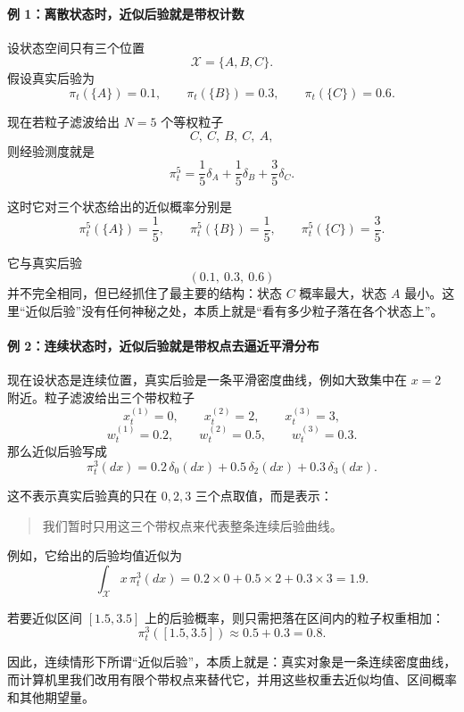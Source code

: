 \documentclass[12pt,a4paper]{ctexart}
\begin{document}
\paragraph{例 1：离散状态时，近似后验就是带权计数}
设状态空间只有三个位置
\[
\mathcal X = \{A,B,C\}.
\]
假设真实后验为
\[
\pi_t(\{A\})=0.1,\qquad
\pi_t(\{B\})=0.3,\qquad
\pi_t(\{C\})=0.6.
\]

现在若粒子滤波给出 \(N=5\) 个等权粒子
\[
C,\ C,\ B,\ C,\ A,
\]
则经验测度就是
\[
\pi_t^5
= \frac15 \delta_A + \frac15 \delta_B + \frac35 \delta_C.
\]

这时它对三个状态给出的近似概率分别是
\[
\pi_t^5(\{A\})=\frac15,\qquad
\pi_t^5(\{B\})=\frac15,\qquad
\pi_t^5(\{C\})=\frac35.
\]

它与真实后验
\[
(0.1,\ 0.3,\ 0.6)
\]
并不完全相同，但已经抓住了最主要的结构：状态 \(C\) 概率最大，状态 \(A\) 最小。这里“近似后验”没有任何神秘之处，本质上就是“看有多少粒子落在各个状态上”。

\paragraph{例 2：连续状态时，近似后验就是带权点去逼近平滑分布}
现在设状态是连续位置，真实后验是一条平滑密度曲线，例如大致集中在 \(x=2\) 附近。粒子滤波给出三个带权粒子
\[
x_t^{(1)}=0,\qquad x_t^{(2)}=2,\qquad x_t^{(3)}=3,
\]
\[
w_t^{(1)}=0.2,\qquad w_t^{(2)}=0.5,\qquad w_t^{(3)}=0.3.
\]
那么近似后验写成
\[
\pi_t^3(dx)
= 0.2\,\delta_0(dx)+0.5\,\delta_2(dx)+0.3\,\delta_3(dx).
\]

这不表示真实后验真的只在 \(0,2,3\) 三个点取值，而是表示：
\begin{quote}
我们暂时只用这三个带权点来代表整条连续后验曲线。
\end{quote}

例如，它给出的后验均值近似为
\[
\int_{\mathcal X} x\,\pi_t^3(dx)
= 0.2\times 0 + 0.5\times 2 + 0.3\times 3
= 1.9.
\]

若要近似区间 \([1.5,3.5]\) 上的后验概率，则只需把落在区间内的粒子权重相加：
\[
\pi_t^3([1.5,3.5]) \approx 0.5+0.3=0.8.
\]

因此，连续情形下所谓“近似后验”，本质上就是：真实对象是一条连续密度曲线，而计算机里我们改用有限个带权点来替代它，并用这些权重去近似均值、区间概率和其他期望量。
\end{document}
